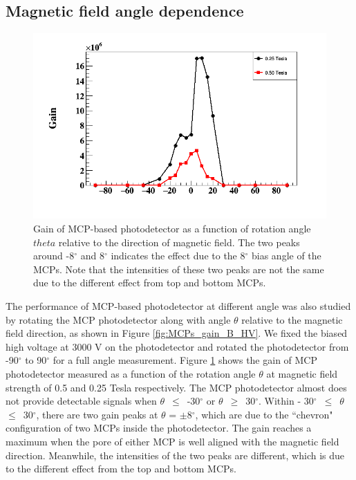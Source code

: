 \documentclass[preprint,5p]{elsarticle}
\begin{document}
\subsection{Magnetic field angle dependence}\label{subsec_theta}

\begin{figure}[tbp]
\centering 
\includegraphics[scale=0.35]{fig/MCPs_gain_theta_B.png}
\caption{Gain of MCP-based photodetector as a function of rotation angle 
   $theta$ relative to the direction of magnetic field. The two peaks around 
-8$^{\circ}$ and 8$^{\circ}$ indicates the effect due to the 8$^{\circ}$ bias 
angle of the MCPs. Note that the intensities of these two peaks are not the 
same due to the different effect from top and bottom MCPs.} 
\label{fig:MCPs_gain_theta_B}
\end{figure}
The performance of MCP-based photodetector at different angle was also studied 
by rotating the MCP photodetector along with angle $\theta$ relative to the 
magnetic field direction, as shown in Figure \ref{fig:MCPs_gain_B_HV}. We fixed 
the biased high voltage at 3000 V on the photodetector and rotated the 
photodetector from -90$^{\circ}$ to 90$^{\circ}$ for a full angle measurement.  
Figure \ref{fig:MCPs_gain_theta_B} shows the gain of MCP photodetector measured 
as a function of the rotation angle $\theta$ at magnetic field strength of 0.5 
and 0.25 Tesla respectively. The MCP photodetector almost does not provide 
detectable signals when $\theta$~$\leq$~-30$^{\circ}$ or 
$\theta$~$\geq$~30$^{\circ}$.  Within - 
30$^{\circ}$~$\leq$~$\theta$~$\leq$~30$^{\circ}$, there are two gain peaks at 
$\theta$ = $\pm$8$^{\circ}$, which are due to the ``chevron" configuration of 
two MCPs inside the photodetector. The gain reaches a maximum when the pore of 
either MCP is well aligned with the magnetic field direction.  Meanwhile, the 
intensities of the two peaks are different, which is due to the different 
effect from the top and bottom MCPs.
\end{document}
